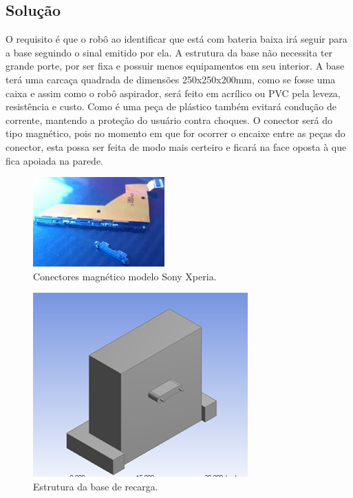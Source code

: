 	\subsection{Solução} %
	\label{sub:solução}
		
		O requisito é que o robô ao identificar que está com bateria baixa irá seguir para a base seguindo o sinal emitido por ela. A estrutura da base não necessita ter grande porte, por ser fixa e possuir menos equipamentos em seu interior. A base terá uma carcaça quadrada de dimensões 250x250x200mm, como se fosse uma caixa e assim como o robô aspirador, será feito em acrílico ou PVC pela leveza, resistência e custo. Como é uma peça de plástico também evitará condução de corrente, mantendo a proteção do usuário contra choques.  O conector será do tipo magnético, pois no momento em que for ocorrer o encaixe entre as peças do conector, esta possa ser feita de modo mais certeiro e ficará na face oposta à que fica apoiada na parede.

		\begin{figure}[H]
			\centering
			\includegraphics[scale=0.8]{figuras/conector_mag.png}
			\caption{Conectores magnético modelo Sony Xperia.}
			\label{img:conectores}
		\end{figure}

		\begin{figure}[H]
			\centering
			\includegraphics[scale=0.8]{figuras/estrutura_base.png}
			\caption{Estrutura da base de recarga.}
			\label{img:estrutura_base}
		\end{figure}	
	

